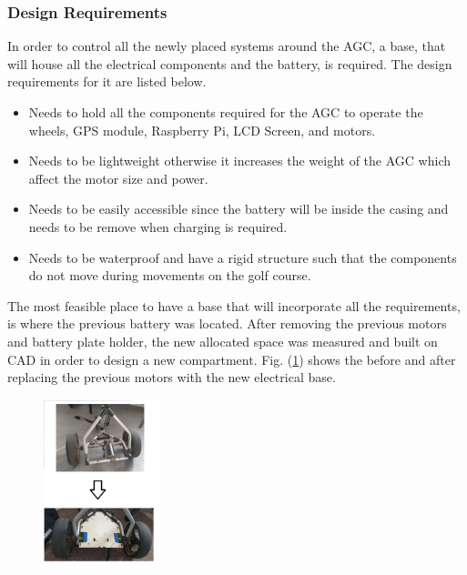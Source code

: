 \documentclass[11pt,landscape]{article}
\begin{document}
\begin{multicols}{3}
\subsubsection{Design Requirements}
In order to control all the newly placed systems around the AGC, a base, that
will house all the electrical components and the battery, is required. The
design requirements for it are listed below.
\begin{itemize}
    \item Needs to hold all the components required for the AGC to operate
    the wheels, GPS module, Raspberry Pi, LCD Screen, and motors.
    \item Needs to be lightweight otherwise it increases the weight of the
    AGC which affect the motor size and power. 
    \item Needs to be easily accessible since the battery will be inside the
    casing and needs to be remove when charging is required.
    \item Needs to be waterproof and have a rigid structure such that the
    components do not move during movements on the golf course.
\end{itemize}
The most feasible place to have a base that will incorporate all the
requirements, is where the previous battery was located. After removing the
previous motors and battery plate holder, the new allocated space was measured
and built on CAD in order to design a new compartment. Fig.
(\ref{fig:prev_base}) shows the before and after replacing the previous motors
with the new electrical base.

\begin{figure}[H]
    \begin{center}
        \includegraphics[width=0.3\textwidth]{Prev AGC base.png}
        \label{fig:prev_base}
    \end{center}
\end{figure}


\end{multicols}
\end{document}
